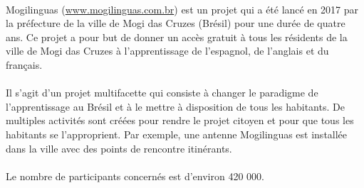 \paragraph{}
Mogilinguas (\url{www.mogilinguas.com.br}) est un projet qui a été lancé en 2017 par la préfecture de la ville de Mogi das Cruzes (Brésil) pour une durée de quatre ans. Ce projet a pour but de donner un accès gratuit à tous les résidents de la ville de Mogi das Cruzes à l’apprentissage de l’espagnol, de l’anglais et du français. 

\paragraph{}
Il s’agit d’un projet multifacette qui consiste à changer le paradigme de l’apprentissage au Brésil et à le mettre à disposition de tous les habitants. De multiples activités sont créées pour rendre le projet citoyen et pour que tous les habitants se l’approprient. Par exemple, une antenne Mogilinguas est installée dans la ville avec des points de rencontre itinérants. 

\paragraph{}
Le nombre de participants concernés est d’environ 420 000. 

